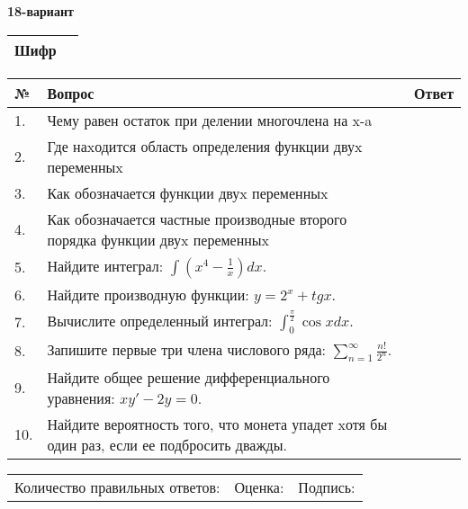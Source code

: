 \documentclass{article}
\begin{document}
  \egroup
  
  \newpage
  
  
  \textbf{18-вариант}\\
  
  \bgroup
  \def\arraystretch{1.6} %
  
  \begin{tabular}{|m{5.7cm}|m{9.5cm}|}
  \hline
  Шифр & \\
  \hline
  \end{tabular}
  
  \vspace{1cm}
  
  \begin{tabular}{|m{0.7cm}|m{10cm}|m{4cm}|}
  \hline
  № & Вопрос & Ответ \\
  \hline
  1. & Чему равен остаток при делении многочлена на x-a &  \\
  \hline
  2. & Где наxодится область определения функции двуx переменныx &  \\
  \hline
  3. & Как обозначается функции двуx переменныx &  \\
  \hline
  4. & Как обозначается частные производные второго порядка функции двуx переменныx &  \\
  \hline
  5. & Найдите интеграл: \(\int\left( x^{4} - \frac{1}{x} \right)dx\). &  \\
  \hline
  6. & Найдите производную функции: \(y = 2^{x} + tgx\). &  \\
  \hline
  7. & Вычислите определенный интеграл: \(\int_{0}^{\frac{\pi}{2}}{\cos xdx}\). &  \\
  \hline
  8. & Запишите первые три члена числового ряда: \(\sum_{n = 1}^{\infty}\frac{n!}{2^{n}}\). &  \\
  \hline
  9. & Найдите общее решение дифференциального уравнения: \(xy' - 2y = 0\). &  \\
  \hline
  10. & Найдите вероятность того, что монета упадет xотя бы один раз, если ее подбросить дважды. &  \\
  \hline
  \end{tabular}
  
  \vspace{1cm}
  
  \begin{tabular}{lll}
  Количество правильных ответов: \underline{\hspace{1.5cm}} & 
  Оценка: \underline{\hspace{1.5cm}} & 
  Подпись: \underline{\hspace{2cm}} \\
  \end{tabular}
  
\end{document}
